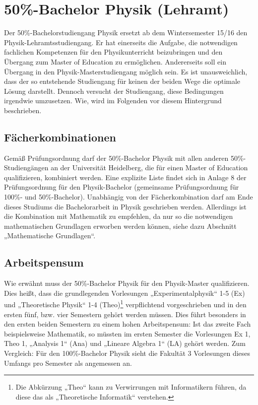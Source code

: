 \section{50\%-Bachelor Physik (Lehramt)} %

Der 50\%-Bachelorstudiengang Physik ersetzt ab dem Wintersemester 15/16 den Physik-Lehramtsstudiengang. Er hat einerseits die Aufgabe, die notwendigen fachlichen Kompetenzen für den Physikunterricht beizubringen und den Übergang zum Master of Education zu ermöglichen. Andererseits soll ein Übergang in den Physik-Masterstudiengang möglich sein. Es ist unausweichlich, dass der so entstehende Studiengang für keinen der beiden Wege die optimale Lösung darstellt. Dennoch versucht der Studiengang, diese Bedingungen irgendwie umzusetzen. Wie, wird im Folgenden vor diesem Hintergrund beschrieben.

\subsection{Fächerkombinationen}

Gemäß Prüfungsordnung darf der 50\%-Bachelor Physik mit allen anderen 50\%-Studiengängen an der Universität Heidelberg, die für einen Master of Education qualifizieren, kombiniert werden. Eine explizite Liste findet sich in Anlage 8 der Prüfungsordnung für den Physik-Bachelor (gemeinsame Prüfungsordnung für 100\%- und 50\%-Bachelor). Unabhängig von der Fächerkombination darf am Ende dieses Studiums die Bachelorarbeit in Physik geschrieben werden. Allerdings ist die Kombination mit Mathematik zu empfehlen, da nur so die notwendigen mathematischen Grundlagen erworben werden können, siehe dazu Abschnitt „Mathematische Grundlagen“.

\subsection{Arbeitspensum}

Wie erwähnt muss der 50\%-Bachelor Physik für den Physik-Master qualifizieren. Dies heißt, dass die grundlegenden Vorlesungen „Experimentalphysik“ 1-5 (\gls{Ex}) und „Theoretische Physik“ 1-4 (\gls{Theo})\footnote{Die Abkürzung „Theo“ kann zu Verwirrungen mit Informatikern führen, da diese das als „Theoretische Informatik“ verstehen.} verpflichtend vorgeschrieben und in den ersten fünf, bzw. vier Semestern gehört werden müssen. Dies führt besonders in den ersten beiden Semestern zu einem hohen Arbeitspensum: Ist das zweite Fach beispielsweise Mathematik, so müssten im ersten Semester die Vorlesungen Ex 1, Theo 1, „Analysis 1“ (\gls{Ana}) und „Lineare Algebra 1“ (\gls{LA}) gehört werden. Zum Vergleich: Für den 100\%-Bachelor Physik sieht die Fakultät 3 Vorlesungen dieses Umfangs pro Semester als angemessen an.

